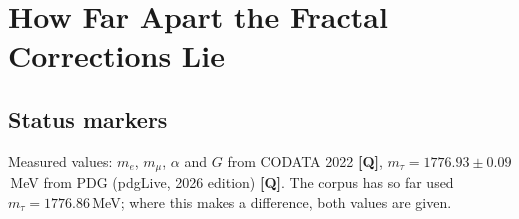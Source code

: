 
\providecommand{\BM}{\textbf{[B]}}
\providecommand{\KM}{\textbf{[K]}}
\providecommand{\SM}{\textbf{[S]}}
\providecommand{\XM}{\textbf{[X]}}
\providecommand{\QM}{\textbf{[Q]}}

\chapter*{How Far Apart the Fractal Corrections Lie}

\begin{abstract}
The basic form of FFGFT is ratio-based; a fractal correction appears only in the translation into
SI units. As a principle, the corpus uses a single factor for this, $K_{\text{frak}}=1-100\xi=74/75$,
the per-step factor of the scale recursion (Docs.~133, 300, 384). In the individual calculations,
however, different values and residuals stand side by side (R154). This document writes each of them
as $n$ in $K=1-n\,\xi$, compares it with $n=100$ and sorts by origin. Result: of all candidates, only
one is a genuine test of the SI translation, the fine-structure constant, and even that only together with the anchoring of the masses in MeV; it requires $n=101.25$,
that is $1.25\,\xi$ away from the rule. All other deviations are algebraic consequences, fitted
quantities, other quantities under the same name, or the distance of the lepton ladder from the Koide
form. The lepton residuals are therefore not a recursion of the measurement but an approximation
error of the ladder, which the Koide form predicts without any measured value. The uniform rule is
not refuted; so far it has been tested exactly once. If the energy unit is chosen so that
$m_em_\mu=54$, the rule lies only $0.06\,\xi$ from $\alpha$, and in additive form; this is an
assignment of the residual, not a prediction.
\end{abstract}

\section*{Status markers}

Measured values: $m_e$, $m_\mu$, $\alpha$ and $G$ from CODATA 2022 \QM, $m_\tau=1776.93\pm0.09$\,MeV
from PDG (pdgLive, 2026 edition) \QM. The corpus has so far used $m_\tau=1776.86$\,MeV; where this
makes a difference, both values are given.

